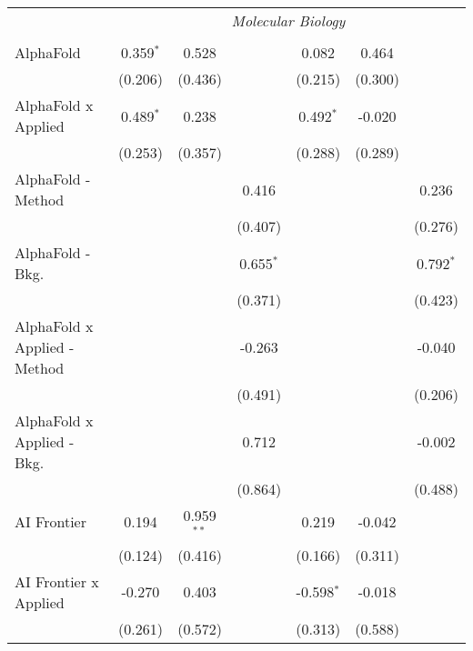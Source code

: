 \begin{tabular}{lcccccc}
 & \multicolumn{6}{c}{\textit{Molecular Biology}} \\ \\
   AlphaFold                      & 0.359$^{*}$ & 0.528        &              & 0.082        & 0.464       &   \\   
                                  & (0.206)     & (0.436)      &              & (0.215)      & (0.300)     &   \\   
   AlphaFold x Applied            & 0.489$^{*}$ & 0.238        &              & 0.492$^{*}$  & -0.020      &   \\   
                                  & (0.253)     & (0.357)      &              & (0.288)      & (0.289)     &   \\   
   AlphaFold - Method             &             &              & 0.416        &              &             & 0.236\\   
                                  &             &              & (0.407)      &              &             & (0.276)\\   
   AlphaFold - Bkg.               &             &              & 0.655$^{*}$  &              &             & 0.792$^{*}$\\   
                                  &             &              & (0.371)      &              &             & (0.423)\\   
   AlphaFold x Applied - Method   &             &              & -0.263       &              &             & -0.040\\   
                                  &             &              & (0.491)      &              &             & (0.206)\\   
   AlphaFold x Applied - Bkg.     &             &              & 0.712        &              &             & -0.002\\   
                                  &             &              & (0.864)      &              &             & (0.488)\\   
   AI Frontier                    & 0.194       & 0.959$^{**}$ &              & 0.219        & -0.042      &   \\   
                                  & (0.124)     & (0.416)      &              & (0.166)      & (0.311)     &   \\   
   AI Frontier x Applied          & -0.270      & 0.403        &              & -0.598$^{*}$ & -0.018      &   \\   
                                  & (0.261)     & (0.572)      &              & (0.313)      & (0.588)     &   \\   

\end{tabular}
